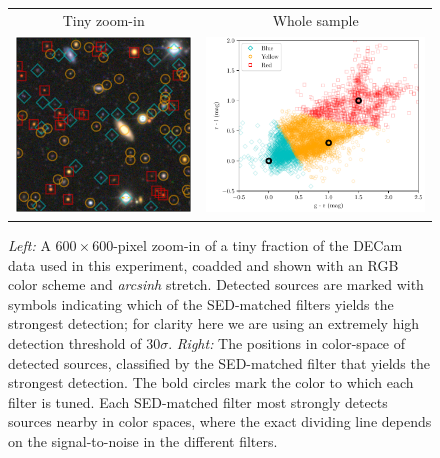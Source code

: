 \documentclass[11pt,letterpaper,linenumbers]{aastex63}
\begin{document}
\begin{figure}
  \begin{center}
    \begin{tabular}{cc}
      Tiny zoom-in & Whole sample \\
      \includegraphics[height=0.4\textwidth]{image-sources-30}
      &
      \includegraphics[height=0.4\textwidth]{best-color-30}
    \end{tabular}
    \caption{\emph{Left:} A $600 \times 600$-pixel zoom-in of a tiny
      fraction of the DECam data used in this experiment, coadded and
      shown with an RGB color scheme and \emph{arcsinh} stretch.
      Detected sources are marked with symbols indicating which of the
      SED-matched filters yields the strongest detection; for clarity
      here we are using an extremely high detection threshold of $30
      \sigma$.  \emph{Right:}
      The positions in color-space of detected sources, classified by
      the SED-matched filter that yields the strongest detection.  The
      bold circles mark the color to which each filter is tuned.  Each
      SED-matched filter most strongly detects sources nearby in color
      spaces, where the exact dividing line depends on the
      signal-to-noise in the different filters.
      \label{fig:expt}}
  \end{center}
\end{figure}
\end{document}
